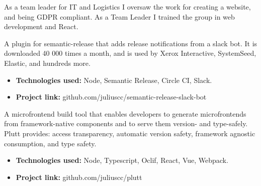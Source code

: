 
As a team leader for IT and Logistics I oversaw the work for creating a website, and being GDPR compliant. As a Team Leader I trained the group in web development and React.


A plugin for semantic-release that adds release notifications from a slack bot. It is downloaded 40 000 times a month, and is used by Xerox Interactive, SystemSeed, Elastic, and hundreds more.

\vspace{4pt}

\begin{itemize}
    \item \textbf{Technologies used:} Node, Semantic Release, Circle CI, Slack.
    \item \textbf{Project link:} github.com/juliuscc/semantic-release-slack-bot
\end{itemize}

\divider

A microfrontend build tool that enables developers to generate microfrontends from framework-native components and to serve them version- and type-safely. Plutt provides: access transparency, automatic version safety, framework agnostic consumption, and type safety.

\vspace{4pt}

\begin{itemize}
    \item \textbf{Technologies used:} Node, Typescript, Oclif, React, Vue, Webpack.
    \item \textbf{Project link:} github.com/juliuscc/plutt
\end{itemize}




